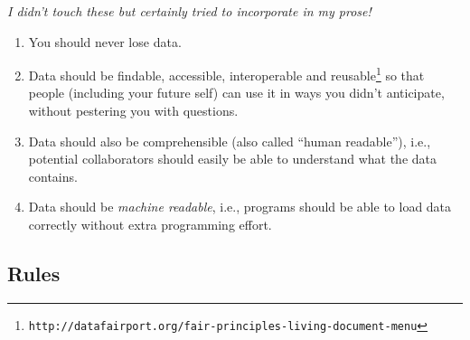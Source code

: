 \documentclass[10pt]{article}
\newcommand{\withurl}[2]{{#1}\footnote{\texttt{#2}}}
\begin{document}
\emph{I didn't touch these but certainly tried to incorporate in my prose!}

\begin{enumerate}
\item
  You should never lose data.
\item
  Data should be \withurl{findable, accessible, interoperable and
    reusable}{http://datafairport.org/fair-principles-living-document-menu}
  so that people (including your future self) can use it in ways you
  didn't anticipate, without pestering you with questions.
\item
  Data should also be comprehensible (also called ``human readable''),
  i.e., potential collaborators should easily be able to understand what
  the data contains.
\item
  Data should be \emph{machine readable}, i.e., programs should be able
  to load data correctly without extra programming effort.
\end{enumerate}

\subsection*{Rules}
\end{document}
